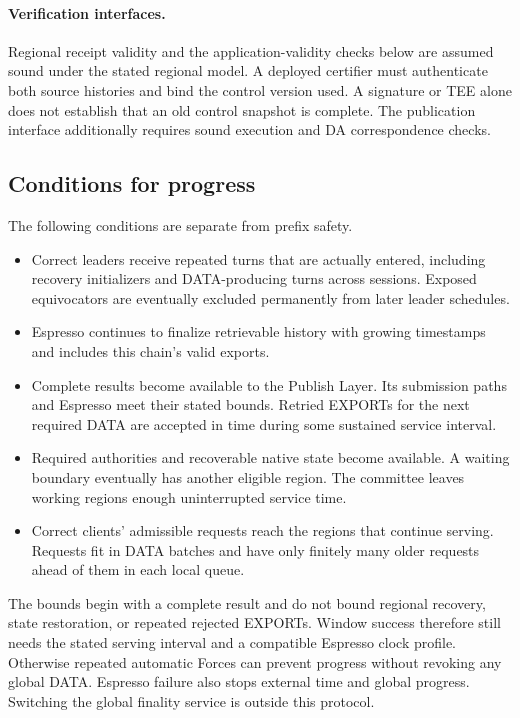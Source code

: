 \documentclass[11pt,a4paper]{article}
\newcounter{protocol}
\begin{document}
\paragraph{Verification interfaces.}
Regional receipt validity and the application-validity checks below
are assumed sound under the stated regional model. A deployed
certifier must authenticate both source histories and bind the control
version used. A signature or TEE alone does not establish that an old
control snapshot is complete. The publication interface additionally
requires sound execution and DA correspondence checks.

\subsection{Conditions for progress}
\label{sec:progress}
The following conditions are separate from prefix safety.
\begin{itemize}
\item Correct leaders receive repeated turns that are actually entered,
including recovery initializers and DATA-producing turns across
sessions. Exposed equivocators are eventually excluded permanently
from later leader schedules.
\item Espresso continues to finalize retrievable history with growing
timestamps and includes this chain's valid exports.
\item Complete results become available to the Publish Layer. Its
submission paths and Espresso meet their stated bounds. Retried EXPORTs
for the next required DATA are accepted in time during some sustained
service interval.
\item Required authorities and recoverable native state become
available. A waiting boundary eventually has another eligible region.
The committee leaves working regions enough uninterrupted service time.
\item Correct clients' admissible requests reach the regions that
continue serving. Requests fit in DATA batches and have only finitely
many older requests ahead of them in each local queue.
\end{itemize}
The bounds begin with a complete result and do not bound regional
recovery, state restoration, or repeated rejected EXPORTs. Window success
therefore still needs the stated serving interval and a compatible
Espresso clock profile. Otherwise repeated automatic Forces can prevent
progress without revoking any global DATA. Espresso failure also stops external time and
global progress. Switching the global finality service is outside this
protocol.
\end{document}
